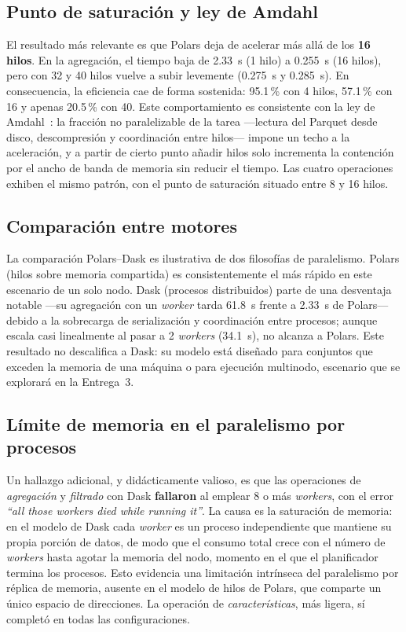 \documentclass[conference]{IEEEtran}
\begin{document}
\subsection{Punto de saturación y ley de Amdahl}
El resultado más relevante es que Polars deja de acelerar más allá de los \textbf{16 hilos}. En la agregación, el tiempo baja de 2.33~s (1 hilo) a 0.255~s (16 hilos), pero con 32 y 40 hilos vuelve a subir levemente (0.275~s y 0.285~s). En consecuencia, la eficiencia cae de forma sostenida: 95.1\,\% con 4 hilos, 57.1\,\% con 16 y apenas 20.5\,\% con 40. Este comportamiento es consistente con la ley de Amdahl~\cite{amdahl1967}: la fracción no paralelizable de la tarea —lectura del Parquet desde disco, descompresión y coordinación entre hilos— impone un techo a la aceleración, y a partir de cierto punto añadir hilos solo incrementa la contención por el ancho de banda de memoria sin reducir el tiempo. Las cuatro operaciones exhiben el mismo patrón, con el punto de saturación situado entre 8 y 16 hilos.

\subsection{Comparación entre motores}
La comparación Polars--Dask es ilustrativa de dos filosofías de paralelismo. Polars (hilos sobre memoria compartida) es consistentemente el más rápido en este escenario de un solo nodo. Dask (procesos distribuidos) parte de una desventaja notable —su agregación con un \textit{worker} tarda 61.8~s frente a 2.33~s de Polars— debido a la sobrecarga de serialización y coordinación entre procesos; aunque escala casi linealmente al pasar a 2 \textit{workers} (34.1~s), no alcanza a Polars. Este resultado no descalifica a Dask: su modelo está diseñado para conjuntos que exceden la memoria de una máquina o para ejecución multinodo, escenario que se explorará en la Entrega~3.

\subsection{Límite de memoria en el paralelismo por procesos}
Un hallazgo adicional, y didácticamente valioso, es que las operaciones de \textit{agregación} y \textit{filtrado} con Dask \textbf{fallaron} al emplear 8 o más \textit{workers}, con el error \textit{``all those workers died while running it''}. La causa es la saturación de memoria: en el modelo de Dask cada \textit{worker} es un proceso independiente que mantiene su propia porción de datos, de modo que el consumo total crece con el número de \textit{workers} hasta agotar la memoria del nodo, momento en el que el planificador termina los procesos. Esto evidencia una limitación intrínseca del paralelismo por réplica de memoria, ausente en el modelo de hilos de Polars, que comparte un único espacio de direcciones. La operación de \textit{características}, más ligera, sí completó en todas las configuraciones.
\end{document}
